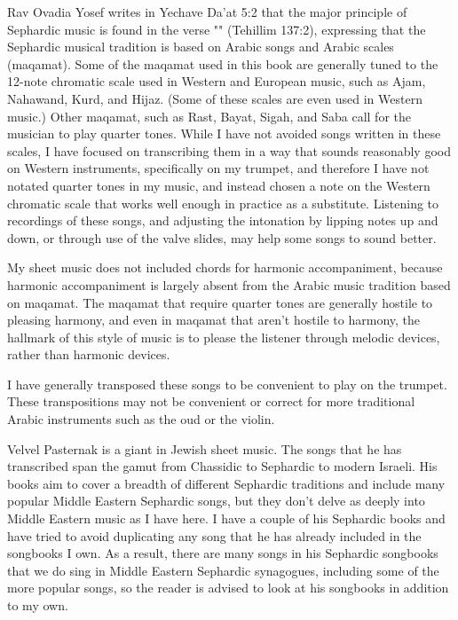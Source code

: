 \documentclass[letterpaper]{memoir}
\begin{document}
Rav Ovadia Yosef writes in Yechave Da'at 5:2 that the major principle of 
Sephardic music is found in the verse 
"" (Tehillim 137:2), expressing that the 
Sephardic musical tradition is based on Arabic songs and Arabic scales 
(maqamat).
Some of the maqamat used in this book are generally tuned to the 12-note chromatic
scale used in Western and European music, such as Ajam, Nahawand, Kurd, and 
Hijaz. (Some of these scales are even used in Western music.)
Other maqamat, such as Rast, Bayat, Sigah, and Saba call for
the musician to play quarter tones. While I have not avoided songs 
written in these scales, I have focused on transcribing them in a way that 
sounds reasonably good on Western instruments, specifically on my trumpet, and 
therefore I have not notated quarter tones in my music, and instead chosen a 
note on the Western chromatic scale that works well enough in practice as a 
substitute. Listening to recordings of these songs, and adjusting the intonation 
by lipping notes up and down, or through use of the valve slides, may help some 
songs to sound better.

My sheet music does not included chords for harmonic accompaniment, because 
harmonic accompaniment is largely absent from the Arabic music tradition based
on maqamat. The maqamat that require quarter tones are generally hostile to 
pleasing harmony, and even in maqamat that aren't hostile to harmony, the 
hallmark of this style of music is to please the listener through melodic 
devices, rather than harmonic devices.

I have generally transposed these songs to be convenient to play on the 
trumpet. These transpositions may not be convenient or correct for more 
traditional Arabic instruments such as the oud or the violin.

Velvel Pasternak is a giant in Jewish sheet music. The songs that he has 
transcribed span the gamut from Chassidic to Sephardic to modern 
Israeli. His books aim to cover a breadth of different Sephardic 
traditions and include many popular Middle Eastern Sephardic songs, but 
they don't delve as deeply into Middle Eastern music as I have here.
I have a couple of his Sephardic books and have tried to avoid 
duplicating any song that he has already included in the songbooks I 
own.
As a result, there are many songs in his Sephardic songbooks 
that we do sing in Middle Eastern Sephardic synagogues, including some 
of the more popular songs, so the reader is advised to look at his 
songbooks in addition to my own.
\end{document}
